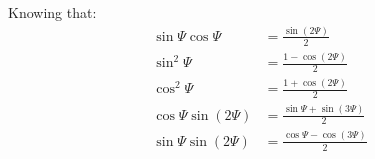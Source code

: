 Knowing that:
\begin{align}
  \label{eq-aero-trigonometric-4}
  \sin \Psi \cos \Psi &= \frac{ \sin \left( 2 \Psi \right) }{2} \\
  \label{eq-aero-trigonometric-5}
  \sin^2 \Psi &= \frac{ 1 - \cos \left( 2 \Psi \right) }{2} \\
  \label{eq-aero-trigonometric-6}
  \cos^2 \Psi &= \frac{ 1 + \cos \left( 2 \Psi \right) }{2} \\
  \label{eq-aero-trigonometric-7}
  \cos \Psi \sin \left( 2 \Psi \right) &=
  \frac{ \sin \Psi + \sin \left( 3 \Psi \right) }{2} \\
  \label{eq-aero-trigonometric-8}
  \sin \Psi \sin \left( 2 \Psi \right) &=
  \frac{ \cos \Psi - \cos \left( 3 \Psi \right) }{2}
\end{align}

